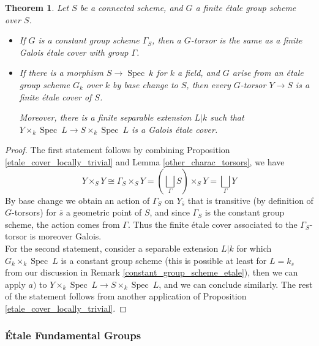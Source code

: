 \documentclass{article}
\theoremstyle{plain}
\newtheorem{theorem}{Theorem}[subsection]
\theoremstyle{definition}
\DeclareMathOperator{\Spec}{Spec}
\begin{document}
\begin{theorem}
    Let $S$ be a connected scheme, and $G$ a finite \'etale group scheme over $S$.
    \begin{itemize}
        \item[$a)$] If $G$ is a constant group scheme $\Gamma_S$, then a $G$-torsor is the same as a finite Galois \'etale cover with group $\Gamma$.
        \item[$b)$] If there is a morphism $S\rightarrow \Spec\:k$ for $k$ a field, and $G$ arise from an \'etale group scheme $G_k$ over $k$ by base change to $S$, then every $G$-torsor $Y\rightarrow S$ is a finite \'etale cover of $S$.

        Moreover, there is a finite separable extension $L|k$ such that $Y\times_k\Spec\:L \rightarrow S\times_k \Spec\: L$ is a Galois \'etale cover.
    \end{itemize}
\end{theorem}
\begin{proof}
    The first statement follows by combining Proposition \ref{etale_cover_locally_trivial} and  Lemma \ref{other_charac_torsors}, we have
    $$Y\times_SY \cong \Gamma_S\times_SY = (\bigsqcup_{\Gamma} S)\times_SY = \bigsqcup_{\Gamma} Y$$
    By base change we obtain an action of $\Gamma_S$ on $Y_{\overline{s}}$ that is transitive (by definition of $G$-torsors) for $\overline{s}$ a geometric point of $S$, and since $\Gamma_S$ is the constant group scheme, the action comes from $\Gamma$.
    Thus the finite \'etale cover associated to the $\Gamma_S$-torsor is moreover Galois.\\
    For the second statement, consider a separable extension $L|k$ for which $G_k\times_k\Spec\:L$ is a constant group scheme (this is possible at least for $L=k_s$ from our discussion in Remark \ref{constant_group_scheme_etale}), 
    then we can apply $a)$ to $Y\times_k \Spec\:L \rightarrow S\times_k\Spec\:L$, and we can conclude similarly.
    The rest of the statement follows from another application of Proposition \ref{etale_cover_locally_trivial}.
\end{proof}




\subsubsection{\'Etale Fundamental Groups}
\end{document}
